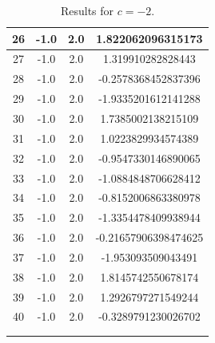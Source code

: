 \documentclass[a4paper, 12pt]{article}
\begin{document}
\begin{longtable}[H]{cccc}
26 & -1.0 & 2.0 & 1.822062096315173    \\ \midrule
27 & -1.0 & 2.0 & 1.319910282828443    \\ \midrule
28 & -1.0 & 2.0 & -0.2578368452837396  \\ \midrule
29 & -1.0 & 2.0 & -1.9335201612141288  \\ \midrule
30 & -1.0 & 2.0 & 1.7385002138215109   \\ \midrule
31 & -1.0 & 2.0 & 1.0223829934574389   \\ \midrule
32 & -1.0 & 2.0 & -0.9547330146890065  \\ \midrule
33 & -1.0 & 2.0 & -1.0884848706628412  \\ \midrule
34 & -1.0 & 2.0 & -0.8152006863380978  \\ \midrule
35 & -1.0 & 2.0 & -1.3354478409938944  \\ \midrule
36 & -1.0 & 2.0 & -0.21657906398474625 \\ \midrule
37 & -1.0 & 2.0 & -1.953093509043491   \\ \midrule
38 & -1.0 & 2.0 & 1.8145742550678174   \\ \midrule
39 & -1.0 & 2.0 & 1.2926797271549244   \\ \midrule
40 & -1.0 & 2.0 & -0.3289791230026702  \\ \bottomrule
\caption{Results for $c = -2$.} \\
\label{tab:recursive_c2} \\
\end{longtable}
\end{document}
